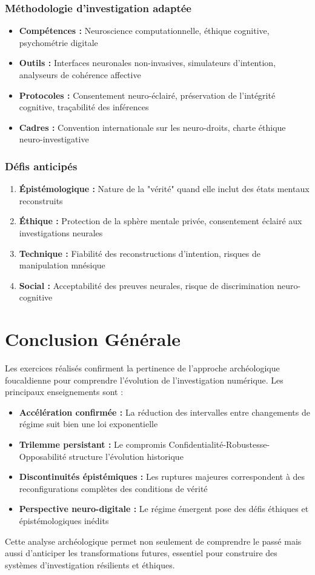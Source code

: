 \documentclass[12pt,a4paper]{article}
\begin{document}
\subsubsection{Méthodologie d'investigation adaptée}

\begin{itemize}
\item \textbf{Compétences :} Neuroscience computationnelle, éthique cognitive, psychométrie digitale
\item \textbf{Outils :} Interfaces neuronales non-invasives, simulateurs d'intention, analyseurs de cohérence affective
\item \textbf{Protocoles :} Consentement neuro-éclairé, préservation de l'intégrité cognitive, traçabilité des inférences
\item \textbf{Cadres :} Convention internationale sur les neuro-droits, charte éthique neuro-investigative
\end{itemize}

\subsubsection{Défis anticipés}

\begin{enumerate}
\item \textbf{Épistémologique :} Nature de la "vérité" quand elle inclut des états mentaux reconstruits
\item \textbf{Éthique :} Protection de la sphère mentale privée, consentement éclairé aux investigations neurales
\item \textbf{Technique :} Fiabilité des reconstructions d'intention, risques de manipulation mnésique
\item \textbf{Social :} Acceptabilité des preuves neurales, risque de discrimination neuro-cognitive
\end{enumerate}

\section*{Conclusion Générale}

Les exercices réalisés confirment la pertinence de l'approche archéologique foucaldienne pour comprendre l'évolution de l'investigation numérique. Les principaux enseignements sont :

\begin{itemize}
\item \textbf{Accélération confirmée :} La réduction des intervalles entre changements de régime suit bien une loi exponentielle
\item \textbf{Trilemme persistant :} Le compromis Confidentialité-Robustesse-Opposabilité structure l'évolution historique
\item \textbf{Discontinuités épistémiques :} Les ruptures majeures correspondent à des reconfigurations complètes des conditions de vérité
\item \textbf{Perspective neuro-digitale :} Le régime émergent pose des défis éthiques et épistémologiques inédits
\end{itemize}

Cette analyse archéologique permet non seulement de comprendre le passé mais aussi d'anticiper les transformations futures, essentiel pour construire des systèmes d'investigation résilients et éthiques.
\end{document}
